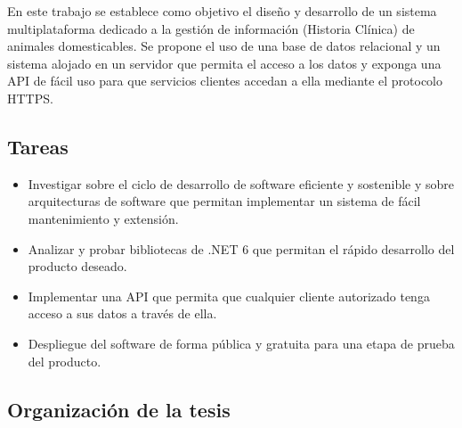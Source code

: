 En este trabajo se establece como objetivo el diseño y desarrollo de un sistema multiplataforma dedicado a la gestión de información (Historia Clínica) de animales domesticables. Se propone el uso de una base de datos relacional y un sistema alojado en un servidor que permita el acceso a los datos y exponga una API de fácil uso para que servicios clientes accedan a ella mediante el protocolo HTTPS.

\subsection*{Tareas}

\begin{itemize}
\item Investigar sobre el ciclo de desarrollo de software eficiente y sostenible y sobre arquitecturas de software que permitan implementar un sistema de fácil mantenimiento y extensión.
\item Analizar y probar bibliotecas de .NET 6 que permitan el rápido desarrollo del producto deseado.
\item Implementar una API que permita que cualquier cliente autorizado tenga acceso a sus datos a través de ella.
\item Despliegue del software de forma pública y gratuita para una etapa de prueba del producto.
\end{itemize}

\subsection*{Organizaci\'on de la tesis}

